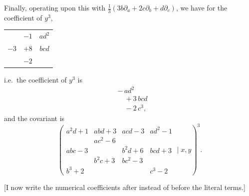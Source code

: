 \documentclass[11pt]{article}
\begin{document}
Finally, operating upon this with $\tfrac{1}{3}(3b\partial_a + 2c\partial_b + d\partial_c)$, we have for the coefficient of $y^3$,
\begin{center}
\begin{tabular}{ccc}
       & $- 1$ & $ad^2$ \\
$- 3$ & $+ 8$  & $b c d$ \\
       & $- 2$ &         \\
\end{tabular}
\end{center}
i.e.\ the coefficient of $y^3$ is
\begin{align*}
&-\,ad^2 \\
&\quad + 3\,bcd \\
&\quad - 2\,c^3,
\end{align*}
and the covariant is
\[
\left(
\begin{array}{cccc}
a^2 d + 1 & abd + 3 & acd - 3 & ad^2 - 1 \\
          & ac^2 - 6 &        &          \\
abc - 3   &          & b^2 d + 6 & bcd + 3 \\
          & b^2 c + 3 & bc^2 - 3 &         \\
b^3 + 2   &          &          & c^3 - 2
\end{array}
\mid x, y\right)^3.
\]

[I now write the numerical coefficients after instead of before the literal terms.]
\end{document}
